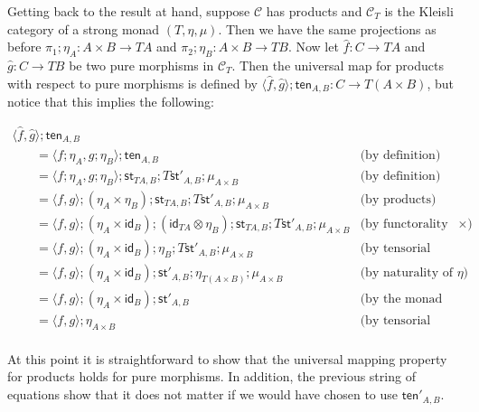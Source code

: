 \documentclass{article}
\let\mto\to
\let\to\relax
\newcommand{\to}{\rightarrow}
\newcommand{\cat}[1]{\mathcal{#1}}
\newcommand{\id}[0]{\mathsf{id}}
\begin{document}
Getting back to the result at hand, suppose $\cat{C}$ has products and
$\cat{C}_T$ is the Kleisli category of a strong monad $(T,\eta,\mu)$.
Then we have the same projections as before $\pi_1;\eta_A : A \times B
\mto TA$ and $\pi_2;\eta_B : A \times B \mto TB$.  Now let $\hat{f} :
C \mto TA$ and $\hat{g} : C \mto TB$ be two pure morphisms in
$\cat{C}_T$.  Then the universal map for products with respect to pure
morphisms is defined by $\langle \hat{f}, \hat{g}
\rangle;\mathsf{ten}_{A,B} : C \mto T(A \times B)$, but notice that
this implies the following:
\begin{center}
  \begin{math}
    \begin{array}{lll}
      \langle \hat{f}, \hat{g}\rangle;\mathsf{ten}_{A,B}\\
      \,\,\,\,\,\,\,\,\,\,\,= \langle f;\eta_A, g;\eta_B\rangle;\mathsf{ten}_{A,B} & \text{(by definition)}\\
      \,\,\,\,\,\,\,\,\,\,\,= \langle f;\eta_A, g;\eta_B\rangle;\mathsf{st}_{TA,B};T\mathsf{st}'_{A,B};\mu_{A \times B} & \text{(by definition)}\\
      \,\,\,\,\,\,\,\,\,\,\,= \langle f, g\rangle;(\eta_A \times \eta_B);\mathsf{st}_{TA,B};T\mathsf{st}'_{A,B};\mu_{A \times B} & \text{(by products)}\\
      \,\,\,\,\,\,\,\,\,\,\,= \langle f, g\rangle;(\eta_A \times \id_{B});(\id_{TA} \otimes \eta_B);\mathsf{st}_{TA,B};T\mathsf{st}'_{A,B};\mu_{A \times B} & \text{(by functorality of $\times$)}\\
      \,\,\,\,\,\,\,\,\,\,\,= \langle f, g\rangle;(\eta_A \times \id_{B});\eta_B;T\mathsf{st}'_{A,B};\mu_{A \times B} & \text{(by tensorial strength)}\\
      \,\,\,\,\,\,\,\,\,\,\,= \langle f, g\rangle;(\eta_A \times \id_{B});\mathsf{st}'_{A,B};\eta_{T(A \times B)};\mu_{A \times B} & \text{(by naturality of $\eta$)}\\
      \,\,\,\,\,\,\,\,\,\,\,= \langle f, g\rangle;(\eta_A \times \id_{B});\mathsf{st}'_{A,B} & \text{(by the monad laws)}\\
      \,\,\,\,\,\,\,\,\,\,\,= \langle f, g\rangle;\eta_{A \times B} & \text{(by tensorial strength)}\\
    \end{array}
  \end{math}
\end{center}
At this point it is straightforward to show that the universal mapping
property for products holds for pure morphisms.  In addition, the
previous string of equations show that it does not matter if we would
have chosen to use $\mathsf{ten}'_{A,B}$.
\end{document}
